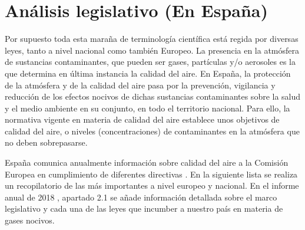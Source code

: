 \section{Análisis legislativo (En España)}\label{teorico-legislativo}

Por supuesto toda esta maraña de terminología científica está regida por diversas leyes, tanto a nivel nacional como también Europeo. La presencia en la atmósfera de sustancias contaminantes, que pueden ser gases, partículas y/o aerosoles es la que determina en última instancia la calidad del aire. En España, la protección de la atmósfera y de la calidad del aire pasa por la prevención, vigilancia y reducción de los efectos nocivos de dichas sustancias contaminantes sobre la salud y el medio ambiente en su conjunto, en todo el territorio nacional. Para ello, la normativa vigente en materia de calidad del aire establece unos objetivos de calidad del aire, o niveles (concentraciones) de contaminantes en la atmósfera que no deben sobrepasarse. 

España comunica anualmente información sobre calidad del aire a la Comisión Europea en cumplimiento de diferentes directivas . En la siguiente lista se realiza un recopilatorio de las más importantes a nivel europeo y nacional. En el informe anual de 2018 \cite{informe_2018}, apartado 2.1 se añade información detallada sobre el marco legislativo y cada una de las leyes que incumber a nuestro país en materia de gases nocivos.

